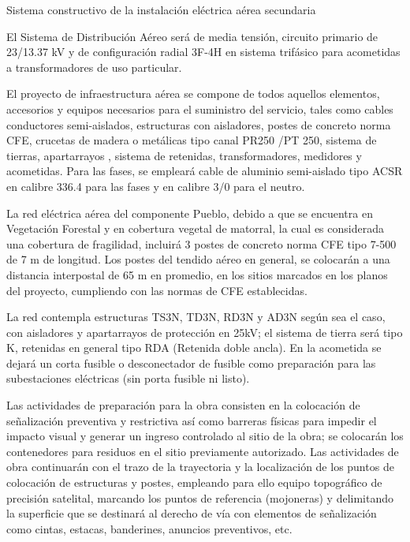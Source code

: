 \documentclass{article}
\begin{document}
\bigskip


\bigskip

Sistema constructivo de la instalación eléctrica aérea secundaria


\bigskip

El Sistema de Distribución Aéreo será de media tensión, circuito primario de 23/13.37 kV y de configuración radial 3F-4H en sistema trifásico para acometidas a transformadores de uso particular.


\bigskip

El proyecto de infraestructura aérea se compone de todos aquellos elementos, accesorios y equipos necesarios para el suministro del servicio, tales como cables conductores semi-aislados, estructuras con aisladores, postes de concreto norma CFE, crucetas de madera o metálicas tipo canal PR250 /PT 250, sistema de tierras, apartarrayos , sistema de retenidas, transformadores, medidores y acometidas. Para las fases, se empleará cable de aluminio semi-aislado tipo ACSR en calibre 336.4 para las fases y en calibre 3/0 para el neutro.


\bigskip

La red eléctrica aérea del componente Pueblo, debido a que se encuentra en Vegetación Forestal y en cobertura vegetal de matorral, la cual es considerada una cobertura de fragilidad, incluirá 3 postes de concreto norma CFE tipo 7-500 de 7 m de longitud. Los postes del tendido aéreo en general, se colocarán a una distancia interpostal de 65 m en promedio, en los sitios marcados en los planos del proyecto, cumpliendo con las normas de CFE establecidas.


\bigskip

La red contempla estructuras TS3N, TD3N, RD3N y AD3N según sea el caso, con aisladores y apartarrayos de protección en 25kV; el sistema de tierra será tipo K, retenidas en general tipo RDA (Retenida doble ancla). En la acometida se dejará un corta fusible o desconectador de fusible como preparación para las subestaciones eléctricas (sin porta fusible ni listo).


\bigskip

Las actividades de preparación para la obra consisten en la colocación de señalización preventiva y restrictiva así como barreras físicas para impedir el impacto visual y generar un ingreso controlado al sitio de la obra; se colocarán los contenedores para residuos en el sitio previamente autorizado. Las actividades de obra continuarán con el trazo de la trayectoria y la localización de los puntos de colocación de estructuras y postes, empleando para ello equipo topográfico de precisión satelital, marcando los puntos de referencia (mojoneras) y delimitando la superficie que se destinará al derecho de vía con elementos de señalización como cintas, estacas, banderines, anuncios preventivos, etc.
\end{document}
